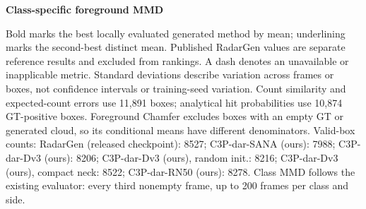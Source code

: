 \begin{table}[t]
\textbf{Class-specific foreground MMD}\par\smallskip
{}
\medskip
\smallskip
\begin{minipage}{\textwidth}
\footnotesize
Bold marks the best locally evaluated generated method by mean; underlining marks the second-best distinct mean. Published RadarGen values are separate reference results and excluded from rankings. A dash denotes an unavailable or inapplicable metric. Standard deviations describe variation across frames or boxes, not confidence intervals or training-seed variation. Count similarity and expected-count errors use 11,891 boxes; analytical hit probabilities use 10,874 GT-positive boxes. Foreground Chamfer excludes boxes with an empty GT or generated cloud, so its conditional means have different denominators. Valid-box counts: RadarGen (released checkpoint): 8527; C3P-dar-SANA (ours): 7988; C3P-dar-Dv3 (ours): 8206; C3P-dar-Dv3 (ours), random init.: 8216; C3P-dar-Dv3 (ours), compact neck: 8522; C3P-dar-RN50 (ours): 8278. Class MMD follows the existing evaluator: every third nonempty frame, up to 200 frames per class and side.
\end{minipage}
\end{table}

